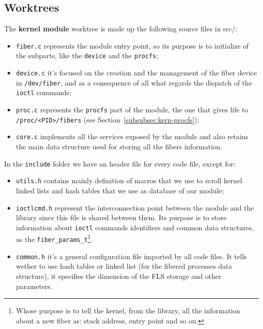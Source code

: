 \documentclass[a4paper,10pt]{article}
\begin{document}
\subsection{Worktrees}
The \textbf{kernel module} worktree is made up the following source files in src/:
\begin{itemize}
	\item \lstinline{fiber.c} represents the module entry point, so its purpose is to initialize of the subparts, like the \lstinline{device} and the \lstinline{procfs};
	\item \lstinline{device.c} it's focused on the creation and the management of the fiber device in \lstinline{/dev/fiber}, and as a consequence of all what regards the dispatch of the \lstinline{ioctl} commands;
	\item \lstinline{proc.c} represents the \lstinline{procfs} part of the module, the one that gives life to \lstinline{/proc/<PID>/fibers} (see Section~\ref{subsubsec:kern-procfs});
	\item \lstinline{core.c} implements all the services exposed by the module and also retains the main data structure used for storing all the fibers information.
\end{itemize}
In the \lstinline{include} folder we have an header file for every code file, except for:
\begin{itemize}
	\item \lstinline{utils.h} contains mainly definition of macros that we use to scroll kernel linked lists and hash tables that we use as database of our module;
	\item \lstinline{ioctlcmd.h} represent the interconnection point between the module and the library since this file is shared between them. Its purpose is to store information about \lstinline{ioctl} commands identifiers and common data structures, as the \lstinline{fiber_params_t}\footnote{Whose purpose is to tell the kernel, from the library, all the information about a new fiber as: stack address, entry point and so on.}.
	\item \lstinline{common.h} it's a general configuration file imported by all code files. It tells wether to use hash tables or linked list (for the fibered processes data structure), it specifies the dimension of the FLS storage and other parameters.
\end{itemize}
\end{document}
